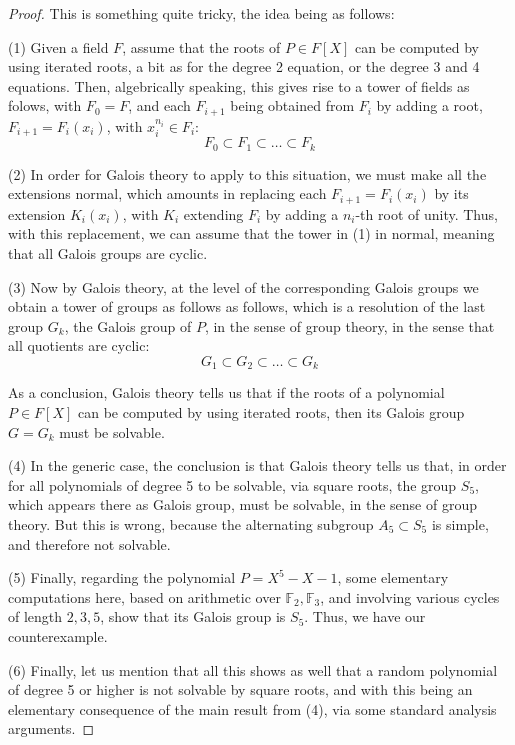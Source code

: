 \documentclass[12pt]{amsbook}
\begin{document}
\begin{proof}
This is something quite tricky, the idea being as follows:

\medskip

(1) Given a field $F$, assume that the roots of $P\in F[X]$ can be computed by using iterated roots, a bit as for the degree 2 equation, or the degree 3 and 4 equations. Then, algebrically speaking, this gives rise to a tower of fields as folows, with $F_0=F$, and each $F_{i+1}$ being obtained from $F_i$ by adding a root, $F_{i+1}=F_i(x_i)$, with $x_i^{n_i}\in F_i$:
$$F_0\subset F_1\subset\ldots\subset F_k$$

(2) In order for Galois theory to apply to this situation, we must make all the extensions normal, which amounts in replacing each $F_{i+1}=F_i(x_i)$ by its extension $K_i(x_i)$, with $K_i$ extending $F_i$ by adding a $n_i$-th root of unity. Thus, with this replacement, we can assume that the tower in (1) in normal, meaning that all Galois groups are cyclic.

\medskip

(3) Now by Galois theory, at the level of the corresponding Galois groups we obtain a tower of groups as follows as follows, which is a resolution of the last group $G_k$, the Galois group of $P$, in the sense of group theory, in the sense that all quotients are cyclic:
$$G_1\subset G_2\subset\ldots\subset G_k$$

As a conclusion, Galois theory tells us that if the roots of a polynomial $P\in F[X]$ can be computed by using iterated roots, then its Galois group $G=G_k$ must be solvable.

\medskip

(4) In the generic case, the conclusion is that Galois theory tells us that, in order for all polynomials of degree 5 to be solvable, via square roots, the group $S_5$, which appears there as Galois group, must be solvable, in the sense of group theory. But this is wrong, because the alternating subgroup $A_5\subset S_5$ is simple, and therefore not solvable.

\medskip

(5) Finally, regarding the polynomial $P=X^5-X-1$, some elementary computations here, based on arithmetic over $\mathbb F_2,\mathbb F_3$, and involving various cycles of length $2,3,5$, show that its Galois group is $S_5$. Thus, we have our counterexample.

\medskip

(6) Finally, let us mention that all this shows as well that a random polynomial of degree 5 or higher is not solvable by square roots, and with this being an elementary consequence of the main result from (4), via some standard analysis arguments.
\end{proof}
\end{document}
